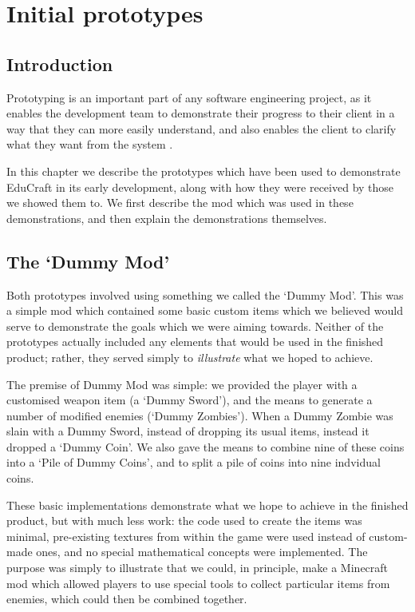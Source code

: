 \chapter{Initial prototypes}

\section{Introduction}
Prototyping is an important part of any software engineering project,
as it enables the development team to demonstrate their progress to
their client in a way that they can more easily understand, and also
enables the client to clarify what they want from the system
\cite{brooks1987,sommerville2011}.

In this chapter we describe the prototypes which have been used to
demonstrate EduCraft in its early development, along with how they were
received by those we showed them to. We first describe the mod which
was used in these demonstrations, and then explain the demonstrations
themselves.

\section{The `Dummy Mod'}
Both prototypes involved using something we called the `Dummy Mod'.
This was a simple mod which contained some basic custom items
which we believed would serve to demonstrate the goals which we were
aiming towards. Neither of the prototypes actually included any
elements that would be used in the finished product; rather, they served
simply to \textit{illustrate} what we hoped to achieve.

The premise of Dummy Mod was simple: we provided the player with a
customised weapon item (a `Dummy Sword'), and the means to generate a
number of modified enemies (`Dummy Zombies'). When a Dummy Zombie was
slain with a Dummy Sword, instead of dropping its usual items, instead it 
dropped a `Dummy Coin'. We also gave the means to combine nine of these coins 
into a `Pile of Dummy Coins', and to split a pile of coins into nine indvidual 
coins.

These basic implementations demonstrate what we hope to achieve in the
finished product, but with much less work: the code used to create the
items was minimal, pre-existing textures from within the game were
used instead of custom-made ones, and no special mathematical concepts
were implemented. The purpose was simply to illustrate that we could,
in principle, make a Minecraft mod which allowed players to use special
tools to collect particular items from enemies, which could then be
combined together.

